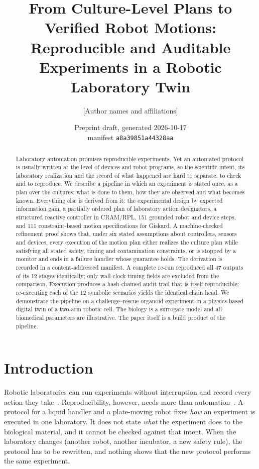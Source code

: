 \documentclass[10pt,a4paper]{article}
\title{From Culture-Level Plans to Verified Robot Motions:\\ Reproducible and Auditable Experiments in a Robotic Laboratory Twin}
\author{[Author names and affiliations]}
\date{Preprint draft, generated 2026-10-17 \\ \small manifest \texttt{a8a39851a44328aa}}
\begin{document}
\maketitle
\begin{abstract}
Laboratory automation promises reproducible experiments. Yet an automated protocol is usually written at the level of devices and robot programs, so the scientific intent, its laboratory realization and the record of what happened are hard to separate, to check and to reproduce. We describe a pipeline in which an experiment is stated once, as a plan over the cultures: what is done to them, how they are observed and what becomes known. Everything else is derived from it: the experimental design by expected information gain, a partially ordered plan of laboratory action designators, a structured reactive controller in CRAM/RPL, 151 grounded robot and device steps, and 111 constraint-based motion specifications for Giskard. A machine-checked refinement proof shows that, under six stated assumptions about controllers, sensors and devices, every execution of the motion plan either realizes the culture plan while satisfying all stated safety, timing and contamination constraints, or is stopped by a monitor and ends in a failure handler whose guarantee holds. The derivation is recorded in a content-addressed manifest. A complete re-run reproduced all 47 outputs of its 12 stages identically; only wall-clock timing fields are excluded from the comparison. Execution produces a hash-chained audit trail that is itself reproducible: re-executing each of the 12 symbolic scenarios yields the identical chain head. We demonstrate the pipeline on a challenge–rescue organoid experiment in a physics-based digital twin of a two-arm robotic cell. The biology is a surrogate model and all biomedical parameters are illustrative. The paper itself is a build product of the pipeline.
\end{abstract}

\section{Introduction}\label{sec:intro}

Robotic laboratories can run experiments without interruption and record every action they take~\citep{king2009,williams2015,burger2020,abolhasani2023}. Reproducibility, however, needs more than automation~\citep{baker2016}. A protocol for a liquid handler and a plate-moving robot fixes \emph{how} an experiment is executed in one laboratory. It does not state \emph{what} the experiment does to the biological material, and it cannot be checked against that intent. When the laboratory changes (another robot, another incubator, a new safety rule), the protocol has to be rewritten, and nothing shows that the new protocol performs the same experiment.
\end{document}
